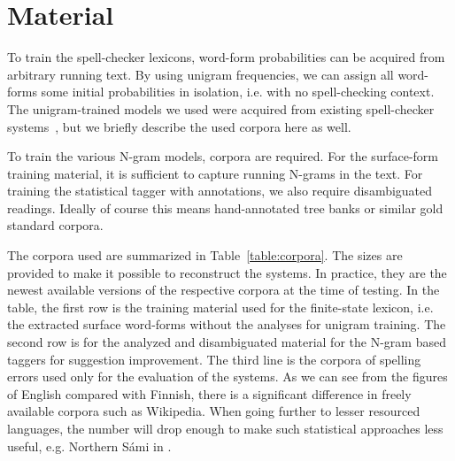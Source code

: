 \documentclass[postprint]{flammie}
\begin{document}
\section{Material}
\label{sec:material}

To train the spell-checker lexicons, word-form probabilities can be acquired
from arbitrary running text. By using unigram frequencies, we can assign
all word-forms some initial probabilities in isolation, i.e. with no spell-checking context.
The unigram-trained models we used were acquired from existing 
spell-checker systems~\cite{norvig/2010,pirinen/2010/lrec}, but we briefly
describe the used corpora here as well.

To train the various N-gram models, corpora are required. For the surface-form
training material, it is sufficient to capture running N-grams in the text.
For training the statistical tagger with annotations, we also require 
disambiguated readings. Ideally of course this means hand-annotated
tree banks or similar gold standard corpora. 


The corpora used are summarized in Table~\ref{table:corpora}. The sizes are
provided to make it possible to reconstruct the systems. In practice, they are the newest
available versions of the respective corpora at the time of testing. In the
table, the first row is the training material used for the finite-state
lexicon, i.e. the extracted surface word-forms without the analyses for unigram
training. The second row is for the analyzed and disambiguated material for the
N-gram based taggers for suggestion improvement. The third line is the corpora
of spelling errors used only for the evaluation of the systems.  As we can see
from the figures of English compared with Finnish, there is a significant
difference in freely available corpora such as Wikipedia. When going further to
lesser resourced languages, the number will drop enough to make such statistical
approaches less useful, e.g. Northern S\'{a}mi in \cite{pirinen/2010/lrec}.
\end{document}
